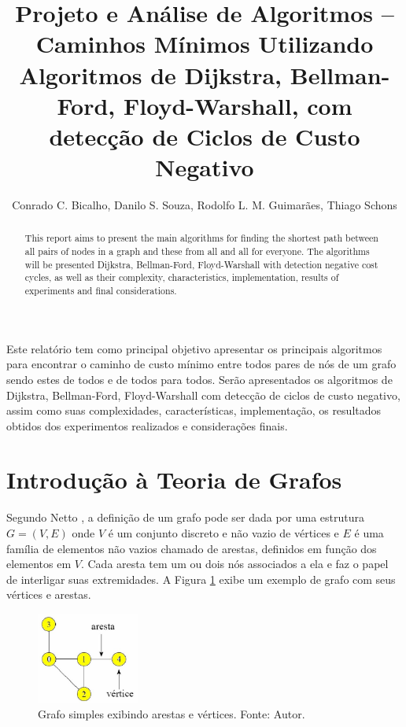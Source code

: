 \documentclass[12pt]{article}
\title{Projeto e Análise de Algoritmos -- \\ Caminhos Mínimos Utilizando Algoritmos de Dijkstra, Bellman-Ford, Floyd-Warshall, com detecção de Ciclos de Custo Negativo}
\author{Conrado C. Bicalho, Danilo S. Souza, Rodolfo L. M. Guimarães, Thiago Schons}
\begin{document}
 

\maketitle

\begin{abstract}
This report aims to present the main algorithms for finding the shortest path between all pairs of nodes in a graph and these from all and all for everyone. The algorithms will be presented Dijkstra, Bellman-Ford, Floyd-Warshall with detection negative cost cycles, as well as their complexity, characteristics, implementation, results of experiments and final considerations.
\end{abstract}
     
\begin{resumo} 
Este relatório tem como principal objetivo apresentar os principais algoritmos para encontrar o caminho de custo mínimo entre todos pares de nós de um grafo sendo estes de todos e de todos para todos. Serão apresentados os algoritmos de Dijkstra, Bellman-Ford, Floyd-Warshall com detecção de ciclos de custo negativo, assim como suas complexidades, características, implementação, os resultados obtidos dos experimentos realizados e considerações finais.
\end{resumo}



\section{Introdução à Teoria de Grafos}

Segundo Netto \cite{netto2003grafos}, a definição de um grafo pode ser dada por uma estrutura $G=(V,E)$ onde $V$ é um conjunto discreto e não vazio de vértices e $E$ é uma família de elementos não vazios chamado de arestas, definidos em função dos elementos em $V$. Cada aresta tem um ou dois nós associados a ela e faz o papel de interligar suas extremidades. A Figura \ref{fig:naoponderado} exibe um exemplo de grafo com seus vértices e arestas.

\begin{figure}[H]
  \centering
    \includegraphics[width=0.3\textwidth]{img/naoponderado.jpg}
  \caption{Grafo simples exibindo arestas e vértices. Fonte: Autor.}
  \label{fig:naoponderado}
\end{figure}
\end{document}
